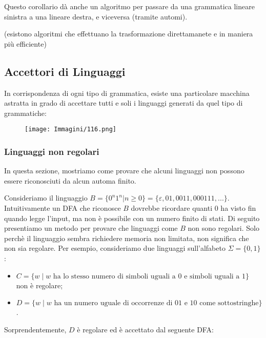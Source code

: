 \documentclass{article}
\begin{document}
\begin{tcolorbox}[colback=red!10!white, colframe=red!50!black, title=\textbf{OSS}]
    Questo corollario dà anche un algoritmo per passare da una grammatica lineare sinistra a una lineare destra, e viceversa (tramite automi).
    
    (esistono algoritmi che effettuano la trasformazione direttamanete e in maniera più efficiente)    
\end{tcolorbox}

\subsection*{Accettori di Linguaggi}
In corrispondenza di ogni tipo di grammatica, esiste una particolare macchina astratta in grado di accettare tutti e soli i linguaggi generati da quel tipo di grammatiche:

\begin{figure}[H]
    \centering
    \texttt{[image: Immagini/116.png]}
    \label{fig:your_image}
\end{figure}

\subsubsection{Linguaggi non regolari}
In questa sezione, mostriamo come provare che alcuni linguaggi non possono essere riconosciuti da alcun automa finito.

Consideriamo il linguaggio $B = \{0^{n}1^{n}|n \geq 0\} = \{\varepsilon,01,0011,000111,...\}$. Intuitivamente un DFA che riconosce $B$ dovrebbe ricordare quanti $0$ ha visto fin quando legge l'input, ma non è possibile con un numero finito di stati.
Di seguito presentiamo un metodo per provare che linguaggi come $B$ non sono regolari.
Solo perchè il linguaggio sembra richiedere memoria non limitata, non significa che non sia regolare.
Per esempio, consideriamo due linguaggi sull'alfabeto $\Sigma = \{0,1\}$:
\begin{itemize}
    \item $C = \{w \mid w \text{ ha lo stesso numero di simboli uguali a 0 e simboli uguali a 1}\}$ non è regolare;
    \item $D = \{w \mid w \text{ ha un numero uguale di occorrenze di 01 e 10 come sottostringhe}\}$.
\end{itemize}

Sorprendentemente, $D$ è regolare ed è accettato dal seguente DFA:
\end{document}
